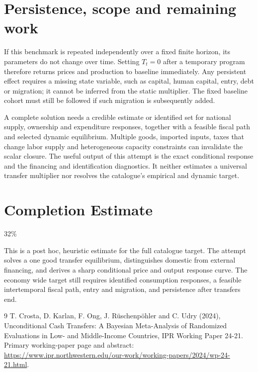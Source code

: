 \documentclass[11pt]{article}
\begin{document}
\section*{Persistence, scope and remaining work}
If this benchmark is repeated independently over a fixed finite horizon, its parameters do not change over time. Setting $T_t=0$ after a temporary program therefore returns prices and production to baseline immediately. Any persistent effect requires a missing state variable, such as capital, human capital, entry, debt or migration; it cannot be inferred from the static multiplier. The fixed baseline cohort must still be followed if such migration is subsequently added.

A complete solution needs a credible estimate or identified set for national supply, ownership and expenditure responses, together with a feasible fiscal path and selected dynamic equilibrium. Multiple goods, imported inputs, taxes that change labor supply and heterogeneous capacity constraints can invalidate the scalar closure. The useful output of this attempt is the exact conditional response and the financing and identification diagnostics. It neither estimates a universal transfer multiplier nor resolves the catalogue's empirical and dynamic target.

\section{Completion Estimate}
32\%

This is a post hoc, heuristic estimate for the full catalogue target.
The attempt solves a one good transfer equilibrium, distinguishes domestic from external financing, and derives a sharp conditional price and output response curve. The economy wide target still requires identified consumption responses, a feasible intertemporal fiscal path, entry and migration, and persistence after transfers end.

\begin{thebibliography}{9}
 T. Crosta, D. Karlan, F. Ong, J. R\"uschenp\"ohler and C. Udry (2024), Unconditional Cash Transfers: A Bayesian Meta-Analysis of Randomized Evaluations in Low- and Middle-Income Countries, IPR Working Paper 24-21. Primary working-paper page and abstract:
\url{https://www.ipr.northwestern.edu/our-work/working-papers/2024/wp-24-21.html}.
\end{thebibliography}
\end{document}
